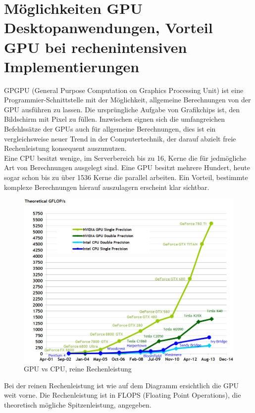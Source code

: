 \documentclass[letterpaper, 12pt]{article}
\let\tempsection\section
\renewcommand\section[1]{\vspace{-0.3cm}\tempsection{#1}\vspace{-0.3cm}}
\begin{document}
\section{Möglichkeiten GPU Desktopanwendungen, Vorteil GPU bei rechenintensiven Implementierungen}
GPGPU (General Purpose Computation on Graphics Processing Unit) ist eine Programmier-Schnittstelle mit der Möglichkeit, allgemeine Berechnungen von der GPU ausführen zu lassen. Die ursprüngliche Aufgabe von Grafikchips ist, den Bildschirm mit Pixel zu füllen. Inzwischen eignen sich die umfangreichen Befehlssätze der GPUs auch für allgemeine Berechnungen, dies ist ein vergleichsweise neuer Trend in der Computertechnik, der darauf abzielt freie Rechenleistung konsequent auszunutzen. \\
Eine CPU besitzt wenige, im Serverbereich bis zu 16, Kerne die für jedmögliche Art von Berechnungen ausgelegt sind. Eine GPU besitzt mehrere Hundert, heute sogar schon bis zu über 1536 Kerne die parallel arbeiten. Ein Vorteil, bestimmte komplexe Berechnungen hierauf auszulagern erscheint klar sichtbar. 
\begin{figure}[!h]
	\begin{center}
		\includegraphics[width=1\linewidth]{images/floating-point-operations-per-second}
		\caption{GPU vs CPU, reine Rechenleistung \cite{comparison}}
		\label{Angabe}
	\end{center}
\end{figure}
Bei der reinen Rechenleistung ist wie auf dem Diagramm ersichtlich die GPU weit vorne. Die Rechenleistung ist in FLOPS (Floating Point Operations), die theoretisch mögliche Spitzenleistung, angegeben.
\end{document}
